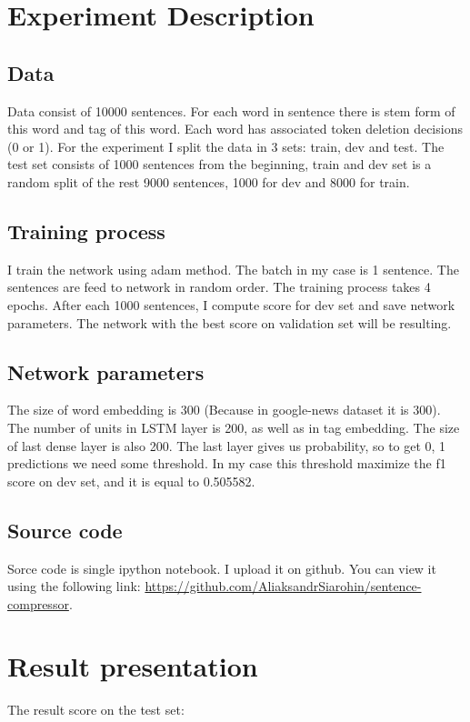 \documentclass[a4paper,12pt,oneside]{article}
\begin{document}
\section{Experiment Description}

\subsection{Data}
Data consist of 10000 sentences. For each word in sentence there is stem form of this word and tag of this word. Each word has associated token deletion decisions (0 or 1). For the experiment I split the data in 3 sets: train, dev and test. The test set consists of 1000 sentences from the beginning, train and dev set is a random split of the rest 9000 sentences, 1000 for dev and 8000 for train.


\subsection{Training process}
I train the network using adam method. The batch in my case is 1 sentence. The sentences are feed to network in random order. The training process takes 4 epochs. After each 1000 sentences, I compute score for dev set and save network parameters. The network with the best score on validation set will be resulting.

\subsection{Network parameters}
The size of word embedding is 300 (Because in google-news dataset it is 300). The number of units in LSTM layer is 200, as well as in tag embedding. The size of last dense layer is also 200. The last layer gives us probability, so to get 0, 1 predictions we need some threshold. In my case this threshold maximize the f1 score on dev set, and it is equal to 0.505582.

\subsection{Source code}
Sorce code is single ipython notebook. I upload it on github. You can view it using the following link: \url{https://github.com/AliaksandrSiarohin/sentence-compressor}.

\section{Result presentation}
The result score on the test set:
\end{document}
